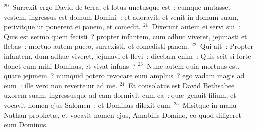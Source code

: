 ${}^{20}$~Surrexit ergo David de terra, et lotus unctusque est~: cumque mutasset vestem, ingressus est domum Domini~: et adoravit, et venit in domum suam, petivitque ut ponerent ei panem, et comedit.
${}^{21}$~Dixerunt autem ei servi sui~: Quis est sermo quem fecisti~? propter infantem, cum adhuc viveret, jejunasti et flebas~: mortuo autem puero, surrexisti, et comedisti panem.
${}^{22}$~Qui ait~: Propter infantem, dum adhuc viveret, jejunavi et flevi~: dicebam enim~: Quis scit si forte donet eum mihi Dominus, et vivat infans~?
${}^{23}$~Nunc autem quia mortuus est, quare jejunem~? numquid potero revocare eum amplius~? ego vadam magis ad eum~: ille vero non revertetur ad me.
${}^{24}$~Et consolatus est David Bethsabee uxorem suam, ingressusque ad eam dormivit cum ea~: qu\ae\ genuit filium, et vocavit nomen ejus Salomon~: et Dominus dilexit eum.
${}^{25}$~Misitque in manu Nathan prophet\ae , et vocavit nomen ejus, Amabilis Domino, eo quod diligeret eum Dominus.


